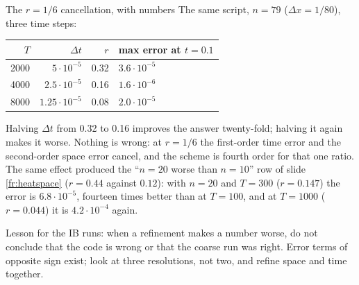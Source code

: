 \documentclass[aspectratio=169,11pt]{beamer}
\begin{document}
\begin{frame}{The $r = 1/6$ cancellation, with numbers}
\label{fr:sixth}
\small
The same script, $n = 79$ ($\Delta x = 1/80$), three time steps:
\begin{center}
\scriptsize
\begin{tabular}{@{}rrrl@{}}
\toprule
$T$ & $\Delta t$ & $r$ & max error at $t = 0.1$ \\
\midrule
2000 & $5 \cdot 10^{-5}$ & 0.32 & $3.6 \cdot 10^{-5}$ \\
4000 & $2.5 \cdot 10^{-5}$ & 0.16 & $1.6 \cdot 10^{-6}$ \\
8000 & $1.25 \cdot 10^{-5}$ & 0.08 & $2.0 \cdot 10^{-5}$ \\
\bottomrule
\end{tabular}
\end{center}
Halving $\Delta t$ from 0.32 to 0.16 improves the answer twenty-fold; halving it again makes it worse. Nothing is wrong: at $r = 1/6$ the first-order time error and the second-order space error cancel, and the scheme is fourth order for that one ratio. The same effect produced the ``$n = 20$ worse than $n = 10$'' row of slide \ref{fr:heatspace} ($r = 0.44$ against $0.12$): with $n = 20$ and $T = 300$ ($r = 0.147$) the error is $6.8 \cdot 10^{-5}$, fourteen times better than at $T = 100$, and at $T = 1000$ ($r = 0.044$) it is $4.2 \cdot 10^{-4}$ again.
\begin{punchbox}
\small Lesson for the IB runs: when a refinement makes a number worse, do not conclude that the code is wrong or that the coarse run was right. Error terms of opposite sign exist; look at three resolutions, not two, and refine space and time together.
\end{punchbox}
\end{frame}
\end{document}
